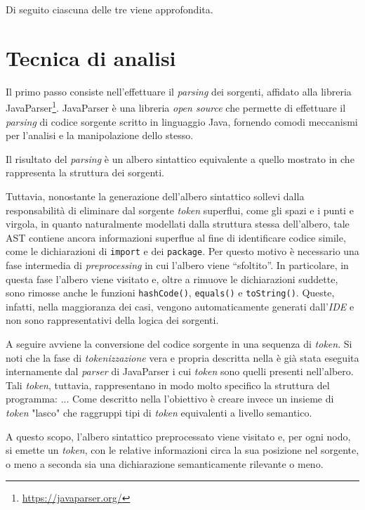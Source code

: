 Di seguito ciascuna delle tre viene approfondita.

\section{Tecnica di analisi}
Il primo passo consiste nell'effettuare il \textit{parsing} dei sorgenti, affidato alla libreria JavaParser\footnote{\url{https://javaparser.org/}}.
%
JavaParser è una libreria \textit{open source} che permette di effettuare il \textit{parsing} di codice sorgente scritto in linguaggio Java, fornendo comodi meccanismi per l'analisi e la manipolazione dello stesso.

Il risultato del \textit{parsing} è un albero sintattico equivalente a quello mostrato in  che rappresenta la struttura dei sorgenti.

Tuttavia, nonostante la generazione dell'albero sintattico sollevi dalla responsabilità di eliminare dal sorgente \textit{token} superflui, come gli spazi e i punti e virgola, in quanto naturalmente modellati dalla struttura stessa dell'albero, tale AST contiene ancora informazioni superflue al fine di identificare codice simile, come le dichiarazioni di \texttt{import} e dei \texttt{package}.
%
Per questo motivo è necessario una fase intermedia di \textit{preprocessing} in cui l'albero viene “sfoltito”. In particolare, in questa fase l'albero viene visitato e, oltre a rimuove le dichiarazioni suddette, sono rimosse anche le funzioni \texttt{hashCode()}, \texttt{equals()} e \texttt{toString()}.
%
Queste, infatti, nella maggioranza dei casi, vengono automaticamente generati dall'\textit{IDE} e non sono rappresentativi della logica dei sorgenti.

A seguire avviene la conversione del codice sorgente in una sequenza di \textit{token}.
%
Si noti che la fase di \textit{tokenizzazione} vera e propria descritta nella  è già stata eseguita internamente dal \textit{parser} di JavaParser i cui \textit{token} sono quelli presenti nell'albero.
%
Tali \textit{token}, tuttavia, rappresentano in modo molto specifico la struttura del programma: ...
%
Come descritto nella  l'obiettivo è creare invece un insieme di \textit{token} "lasco" che raggruppi tipi di \textit{token} equivalenti a livello semantico.

A questo scopo, l'albero sintattico preprocessato viene visitato e, per ogni nodo, si emette un \textit{token}, con le relative informazioni circa la sua posizione nel sorgente, o meno a seconda sia una dichiarazione semanticamente rilevante o meno.

